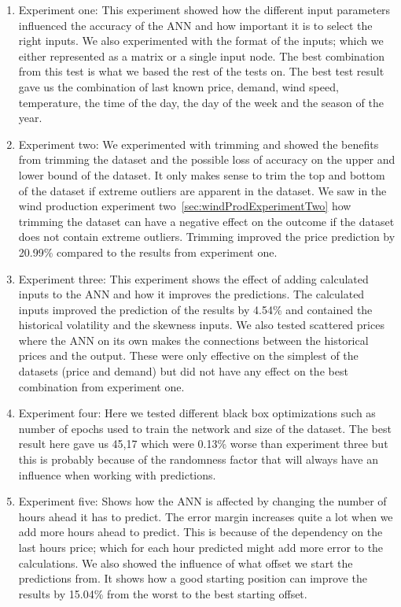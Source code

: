 \begin{enumerate}
	\item Experiment one: This experiment showed how the different input parameters influenced the accuracy of the ANN and how important it is to select the right inputs. We also experimented with the format of the inputs; which we either represented as a matrix or a single input node. The best combination from this test is what we based the rest of the tests on. The best test result gave us the combination of last known price, demand, wind speed, temperature, the time of the day, the day of the week and the season of the year.
	\item Experiment two: We experimented with trimming and showed the benefits from trimming the dataset and the possible loss of accuracy on the upper and lower bound of the dataset. It only makes sense to trim the top and bottom of the dataset if extreme outliers are apparent in the dataset. We saw in the wind production experiment two~\ref{sec:windProdExperimentTwo} how trimming the dataset can have a negative effect on the outcome if the dataset does not contain extreme outliers. Trimming improved the price prediction by 20.99\% compared to the results from experiment one.
	\item Experiment three: This experiment shows the effect of adding calculated inputs to the ANN and how it improves the predictions. The calculated inputs improved the prediction of the results by 4.54\% and contained the historical volatility and the skewness inputs. We also tested scattered prices where the ANN on its own makes the connections between the historical prices and the output. These were only effective on the simplest of the datasets (price and demand) but did not have any effect on the best combination from experiment one.
	\item Experiment four: Here we tested different black box optimizations such as number of epochs used to train the network and size of the dataset. The best result here gave us 45,17 which were 0.13\% worse than experiment three but this is probably because of the randomness factor that will always have an influence when working with predictions.
	\item Experiment five: Shows how the ANN is affected by changing the number of hours ahead it has to predict. The error margin increases quite a lot when we add more hours ahead to predict. This is because of the dependency on the last hours price; which for each hour predicted might add more error to the calculations. We also showed the influence of what offset we start the predictions from. It shows how a good starting position can improve the results by 15.04\% from the worst to the best starting offset.
\end{enumerate}
